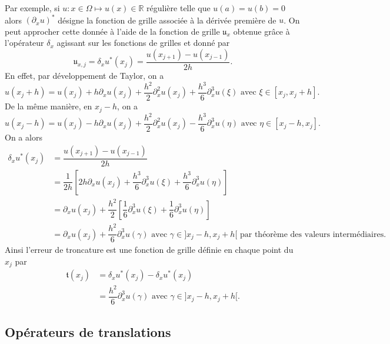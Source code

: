 Par exemple, si $u : x \in \Omega \mapsto u(x) \in \mathbb{R}$ régulière telle que $u(a) = u(b) = 0$ alors $(\partial_x u)^*$ désigne la fonction de grille associée à la dérivée première de $u$. On peut approcher cette donnée à l'aide de la fonction de grille $\mathfrak{u}_x$ obtenue grâce à l'opérateur $\delta_x$ agissant sur les fonctions de grilles et donné par
\begin{equation}
\mathfrak{u}_{x,j} = \delta_x u^*(x_j) = \dfrac{u(x_{j+1}) - u(x_{j-1})}{2h}.
\end{equation}
En effet, par développement de Taylor, on a 
\begin{equation}
u(x_j+h) = u(x_j) + h \partial_x u(x_j) + \dfrac{h^2}{2} \partial_x^2 u(x_j) + \dfrac{h^3}{6} \partial_x^3 u(\xi) \text{ avec } \xi \in [x_j, x_j+h].
\end{equation}
De la même manière, en $x_j-h$, on a 
\begin{equation}
u(x_j-h) = u(x_j) - h \partial_x u(x_j) + \dfrac{h^2}{2} \partial_x^2 u(x_j) - \dfrac{h^3}{6} \partial_x^3 u(\eta) \text{ avec } \eta \in [x_j-h, x_j].
\end{equation}
On a alors
\begin{align*}
\delta_x u^*(x_j) & = \dfrac{u(x_{j+1}) - u(x_{j-1})}{2h}\\
                  & = \dfrac{1}{2h} \left[ 2h \partial_x u(x_j) + \dfrac{h^3}{6} \partial_x^3 u(\xi) + \dfrac{h^3}{6} \partial_x^3 u(\eta) \right]\\
                  & = \partial_x u(x_j) + \dfrac{h^2}{2} \left[ \dfrac{1}{6} \partial_x^3 u(\xi) + \dfrac{1}{6} \partial_x^3 u(\eta) \right] \\
                  & = \partial_x u(x_j) + \dfrac{h^2}{6} \partial_x^3 u(\gamma) \text{ avec } \gamma \in ]x_j-h , x_j+h[ \text{ par théorème des valeurs intermédiaires.}
\end{align*}
Ainsi l'erreur de troncature est une fonction de grille définie en chaque point du $x_j$ par
\begin{align*}
\mathfrak{t}(x_j) & = \delta_x u^*(x_j) - \delta_x u^*(x_j)\\
                  & = \dfrac{h^2}{6} \partial_x^3 u(\gamma) \text{ avec } \gamma \in ]x_j-h , x_j+h[.
\end{align*}










\subsection{Opérateurs de translations}


